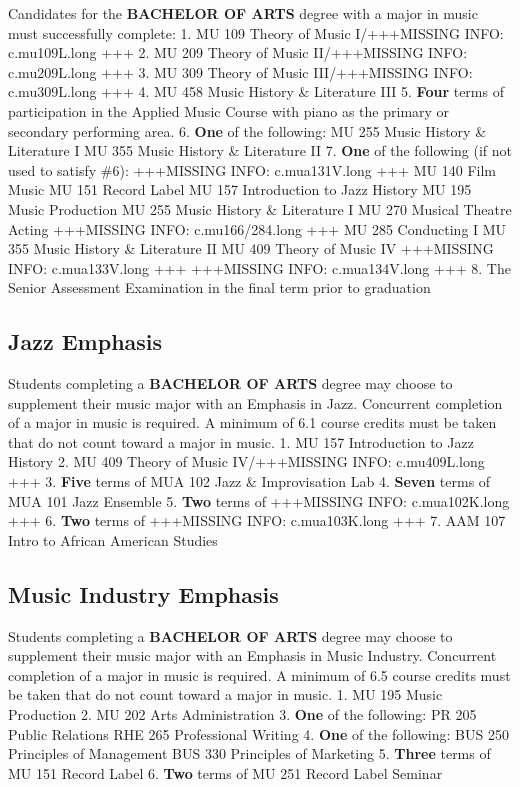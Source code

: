 \documentclass[
  letterpaper,
]{scrbook}
\begin{document}
Candidates for the \textbf{BACHELOR OF ARTS} degree with a major in
music must successfully complete: 1. MU 109 Theory of Music I/+++MISSING
INFO: c.mu109L.long +++ 2. MU 209 Theory of Music II/+++MISSING INFO:
c.mu209L.long +++ 3. MU 309 Theory of Music III/+++MISSING INFO:
c.mu309L.long +++ 4. MU 458 Music History \& Literature III 5.
\textbf{Four} terms of participation in the Applied Music Course with
piano as the primary or secondary performing area. 6. \textbf{One} of
the following: MU 255 Music History \& Literature I MU 355 Music History
\& Literature II 7. \textbf{One} of the following (if not used to
satisfy \#6): +++MISSING INFO: c.mua131V.long +++ MU 140 Film Music MU
151 Record Label MU 157 Introduction to Jazz History MU 195 Music
Production MU 255 Music History \& Literature I MU 270 Musical Theatre
Acting +++MISSING INFO: c.mu166/284.long +++ MU 285 Conducting I MU 355
Music History \& Literature II MU 409 Theory of Music IV +++MISSING
INFO: c.mua133V.long +++ +++MISSING INFO: c.mua134V.long +++ 8. The
Senior Assessment Examination in the final term prior to graduation

\subsection{Jazz Emphasis}\label{jazz-emphasis}

Students completing a \textbf{BACHELOR OF ARTS} degree may choose to
supplement their music major with an Emphasis in Jazz. Concurrent
completion of a major in music is required. A minimum of 6.1 course
credits must be taken that do not count toward a major in music. 1. MU
157 Introduction to Jazz History 2. MU 409 Theory of Music IV/+++MISSING
INFO: c.mu409L.long +++ 3. \textbf{Five} terms of MUA 102 Jazz \&
Improvisation Lab 4. \textbf{Seven} terms of MUA 101 Jazz Ensemble 5.
\textbf{Two} terms of +++MISSING INFO: c.mua102K.long +++ 6.
\textbf{Two} terms of +++MISSING INFO: c.mua103K.long +++ 7. AAM 107
Intro to African American Studies

\subsection{Music Industry Emphasis}\label{music-industry-emphasis}

Students completing a \textbf{BACHELOR OF ARTS} degree may choose to
supplement their music major with an Emphasis in Music Industry.
Concurrent completion of a major in music is required. A minimum of 6.5
course credits must be taken that do not count toward a major in music.
1. MU 195 Music Production 2. MU 202 Arts Administration 3. \textbf{One}
of the following: PR 205 Public Relations RHE 265 Professional Writing
4. \textbf{One} of the following: BUS 250 Principles of Management BUS
330 Principles of Marketing 5. \textbf{Three} terms of MU 151 Record
Label 6. \textbf{Two} terms of MU 251 Record Label Seminar
\end{document}
